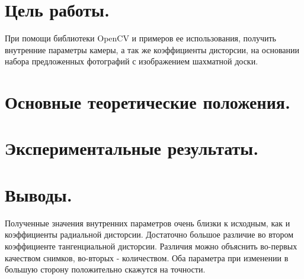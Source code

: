 \documentclass[14pt]{article}
\begin{document}
	
	
	\section{Цель работы.}
		При помощи библиотеки OpenCV и примеров ее использования, получить внутренние параметры камеры, а так же коэффициенты дисторсии, на основании набора предложенных фотографий с изображением шахматной доски.
	
	\section*{Основные теоретические положения.}
		
	
	\section*{Экспериментальные результаты.}
		
	
	\section*{Выводы.}
		Полученные значения внутренних параметров очень близки к исходным, как и коэффициенты радиальной дисторсии. Достаточно большое различие во втором коэффициенте тангенциальной дисторсии. Различия можно объяснить во-первых качеством снимков, во-вторых - количеством. Оба параметра при изменении в большую сторону положительно скажутся на точности. 
	
\end{document}
